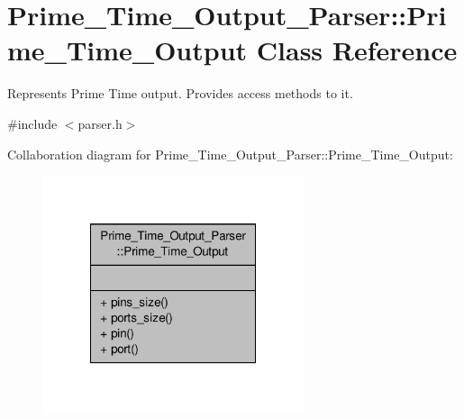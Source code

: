 \hypertarget{classPrime__Time__Output__Parser_1_1Prime__Time__Output}{\section{Prime\-\_\-\-Time\-\_\-\-Output\-\_\-\-Parser\-:\-:Prime\-\_\-\-Time\-\_\-\-Output Class Reference}
\label{classPrime__Time__Output__Parser_1_1Prime__Time__Output}
}


Represents Prime Time output. Provides access methods to it.  




{\ttfamily \#include $<$parser.\-h$>$}



Collaboration diagram for Prime\-\_\-\-Time\-\_\-\-Output\-\_\-\-Parser\-:\-:Prime\-\_\-\-Time\-\_\-\-Output\-:\nopagebreak
\begin{figure}[H]
\begin{center}
\leavevmode
\includegraphics[width=216pt]{classPrime__Time__Output__Parser_1_1Prime__Time__Output__coll__graph}
\end{center}
\end{figure}

